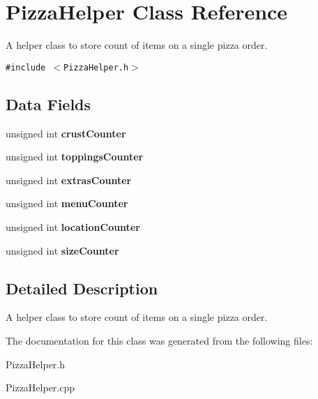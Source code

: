 \hypertarget{class_pizza_helper}{
\section{Pizza\-Helper Class Reference}
\label{class_pizza_helper}
}
A helper class to store count of items on a single pizza order.  


{\tt \#include $<$Pizza\-Helper.h$>$}

\subsection*{Data Fields}
\begin{CompactItemize}
\item 
\hypertarget{class_pizza_helper_52b9d4656b374668f8dac25cdbdfd1e0}{
unsigned int {\bf crust\-Counter}}
\label{class_pizza_helper_52b9d4656b374668f8dac25cdbdfd1e0}

\item 
\hypertarget{class_pizza_helper_450c3826ea82a6622f93e6bdcc939268}{
unsigned int {\bf toppings\-Counter}}
\label{class_pizza_helper_450c3826ea82a6622f93e6bdcc939268}

\item 
\hypertarget{class_pizza_helper_34a07585521538b7d236fcce04fb998e}{
unsigned int {\bf extras\-Counter}}
\label{class_pizza_helper_34a07585521538b7d236fcce04fb998e}

\item 
\hypertarget{class_pizza_helper_e91a67288d9c8eaaa93feeebcfbd1d10}{
unsigned int {\bf menu\-Counter}}
\label{class_pizza_helper_e91a67288d9c8eaaa93feeebcfbd1d10}

\item 
\hypertarget{class_pizza_helper_225c04650660e2540bff4522e1c13627}{
unsigned int {\bf location\-Counter}}
\label{class_pizza_helper_225c04650660e2540bff4522e1c13627}

\item 
\hypertarget{class_pizza_helper_00e1b751a8e3e1d3b531bbbcd4e40948}{
unsigned int {\bf size\-Counter}}
\label{class_pizza_helper_00e1b751a8e3e1d3b531bbbcd4e40948}

\end{CompactItemize}


\subsection{Detailed Description}
A helper class to store count of items on a single pizza order. 



The documentation for this class was generated from the following files:\begin{CompactItemize}
\item 
Pizza\-Helper.h\item 
Pizza\-Helper.cpp\end{CompactItemize}
